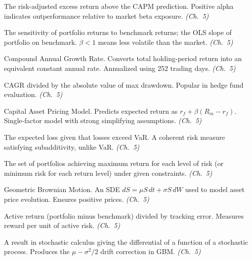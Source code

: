 \begin{description}[style=nextline, leftmargin=2em]

\item[\textbf{Alpha (Jensen's)}] The risk-adjusted excess return above the CAPM prediction. Positive alpha indicates outperformance relative to market beta exposure. \textit{(Ch.~5)}

\item[\textbf{Beta}] The sensitivity of portfolio returns to benchmark returns; the OLS slope of portfolio on benchmark. $\beta < 1$ means less volatile than the market. \textit{(Ch.~5)}

\item[\textbf{CAGR}] Compound Annual Growth Rate. Converts total holding-period return into an equivalent constant annual rate. Annualized using 252 trading days. \textit{(Ch.~5)}

\item[\textbf{Calmar Ratio}] CAGR divided by the absolute value of max drawdown. Popular in hedge fund evaluation. \textit{(Ch.~5)}

\item[\textbf{CAPM}] Capital Asset Pricing Model. Predicts expected return as $r_f + \beta(R_m - r_f)$. Single-factor model with strong simplifying assumptions. \textit{(Ch.~5)}

\item[\textbf{CVaR / Expected Shortfall}] The expected loss given that losses exceed VaR. A coherent risk measure satisfying subadditivity, unlike VaR. \textit{(Ch.~5)}

\item[\textbf{Efficient Frontier}] The set of portfolios achieving maximum return for each level of risk (or minimum risk for each return level) under given constraints. \textit{(Ch.~5)}

\item[\textbf{GBM}] Geometric Brownian Motion. An SDE $dS = \mu S\,dt + \sigma S\,dW$ used to model asset price evolution. Ensures positive prices. \textit{(Ch.~5)}

\item[\textbf{Information Ratio}] Active return (portfolio minus benchmark) divided by tracking error. Measures reward per unit of active risk. \textit{(Ch.~5)}

\item[\textbf{Ito's Lemma}] A result in stochastic calculus giving the differential of a function of a stochastic process. Produces the $\mu - \sigma^2/2$ drift correction in GBM. \textit{(Ch.~5)}


\end{description}
